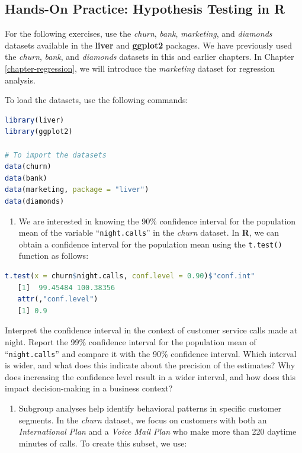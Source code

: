 \documentclass[
  11pt,
]{book}
\newcommand{\passthrough}[1]{#1}
\providecommand{\tightlist}{%
  \setlength{\itemsep}{0pt}\setlength{\parskip}{0pt}}
\theoremstyle{definition}
\theoremstyle{definition}
\theoremstyle{definition}
\theoremstyle{definition}
\theoremstyle{remark}
\begin{document}
\subsection*{Hands-On Practice: Hypothesis Testing in R}\label{hands-on-practice-hypothesis-testing-in-r}


For the following exercises, use the \emph{churn}, \emph{bank}, \emph{marketing}, and \emph{diamonds} datasets available in the \textbf{liver} and \textbf{ggplot2} packages. We have previously used the \emph{churn}, \emph{bank}, and \emph{diamonds} datasets in this and earlier chapters. In Chapter \ref{chapter-regression}, we will introduce the \emph{marketing} dataset for regression analysis.

To load the datasets, use the following commands:

\begin{lstlisting}[language=R]
library(liver)
library(ggplot2)   

# To import the datasets
data(churn)  
data(bank)  
data(marketing, package = "liver")  
data(diamonds)  
\end{lstlisting}

\begin{enumerate}
\def\labelenumi{\arabic{enumi}.}
\setcounter{enumi}{9}
\tightlist
\item
  We are interested in knowing the 90\% confidence interval for the population mean of the variable ``\passthrough{\lstinline!night.calls!}'' in the \emph{churn} dataset. In \textbf{R}, we can obtain a confidence interval for the population mean using the \passthrough{\lstinline!t.test()!} function as follows:
\end{enumerate}

\begin{lstlisting}[language=R]
t.test(x = churn$night.calls, conf.level = 0.90)$"conf.int"
   [1]  99.45484 100.38356
   attr(,"conf.level")
   [1] 0.9
\end{lstlisting}

Interpret the confidence interval in the context of customer service calls made at night. Report the 99\% confidence interval for the population mean of ``\passthrough{\lstinline!night.calls!}'' and compare it with the 90\% confidence interval. Which interval is wider, and what does this indicate about the precision of the estimates? Why does increasing the confidence level result in a wider interval, and how does this impact decision-making in a business context?

\begin{enumerate}
\def\labelenumi{\arabic{enumi}.}
\setcounter{enumi}{10}
\tightlist
\item
  Subgroup analyses help identify behavioral patterns in specific customer segments. In the \emph{churn} dataset, we focus on customers with both an \emph{International Plan} and a \emph{Voice Mail Plan} who make more than 220 daytime minutes of calls. To create this subset, we use:
\end{enumerate}
\end{document}
